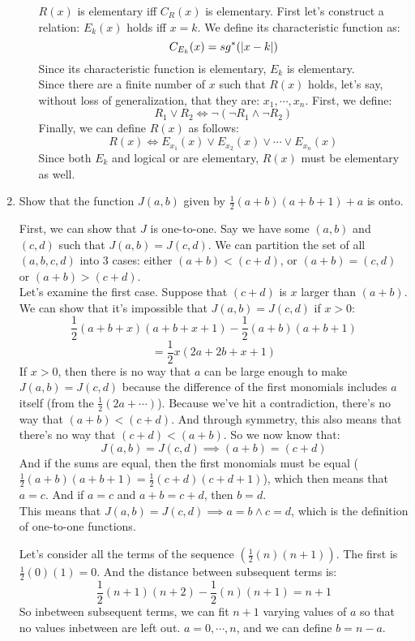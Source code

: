 \begin{enumerate}
\begin{enumerate}
        $R(x)$ is elementary iff $C_R(x)$ is elementary. First let's construct a relation: $E_k(x)$ holds iff $x=k$. We define its characteristic function as:
        $$C_{E_k}(x) = sg^*(\left\vert x-k \right\vert)$$
        Since its characteristic function is elementary, $E_k$ is elementary.\\
        Since there are a finite number of $x$ such that $R(x)$ holds, let's say, without loss of generalization, that they are: $x_1, \cdots, x_n$. First, we define:
        $$R_1 \lor R_2 \iff \neg(\neg R_1 \land \neg R_2)$$
        Finally, we can define $R(x)$ as follows:
        $$R(x) \iff E_{x_1}(x) \lor E_{x_2}(x) \lor \cdots \lor E_{x_n}(x)$$
        Since both $E_k$ and logical or are elementary, $R(x)$ must be elementary as well.
        
    \end{enumerate}
  \item 
    \begin{question}
      Show that the function $J(a,b)$ given by $\frac{1}{2}(a+b)(a+b+1) + a$ is onto.
    \end{question}

    First, we can show that $J$ is one-to-one. Say we have some $(a,b)$ and $(c,d)$ such that $J(a,b) = J(c,d)$. We can partition the set of all $(a,b,c,d)$ into 3 cases: either $(a+b) < (c+d)$, or $(a+b) = (c,d)$ or $(a+b) > (c+d)$.\\

    Let's examine the first case. Suppose that $(c+d)$ is $x$ larger than $(a+b)$. We can show that it's impossible that $J(a,b) = J(c,d)$ if $x > 0$:
    $$\frac{1}{2}(a+b+x)(a+b+x+1) - \frac{1}{2}(a+b)(a+b+1)$$
    $$= \frac{1}{2}x(2a + 2b + x + 1)$$
    If $x > 0$, then there is no way that $a$ can be large enough to make $J(a,b) = J(c,d)$ because the difference of the first monomials includes $a$ itself (from the $\frac{1}{2}(2a + \cdots)$). Because we've hit a contradiction, there's no way that $(a+b) < (c+d)$. And through symmetry, this also means that there's no way that $(c+d) < (a+b)$. So we now know that:
    $$J(a,b) = J(c,d) \implies (a+b) = (c+d)$$
    And if the sums are equal, then the first monomials must be equal ($\frac{1}{2}(a+b)(a+b+1) = \frac{1}{2}(c+d)(c+d+1)$), which then means that $a = c$. And if $a = c$ and $a+b = c+d$, then $b = d$.\\
    This means that $J(a,b) = J(c,d) \implies a=b \land c=d$, which is the definition of one-to-one functions.




    Let's consider all the terms of the sequence $(\frac{1}{2}(n)(n+1))$. The first is $\frac{1}{2}(0)(1) = 0$. And the distance between subsequent terms is:
    $$\frac{1}{2}(n+1)(n+2) - \frac{1}{2}(n)(n+1) = n + 1$$
    So inbetween subsequent terms, we can fit $n+1$ varying values of $a$ so that no values inbetween are left out. $a = 0, \cdots, n$, and we can define $b = n-a$.
\end{enumerate}

